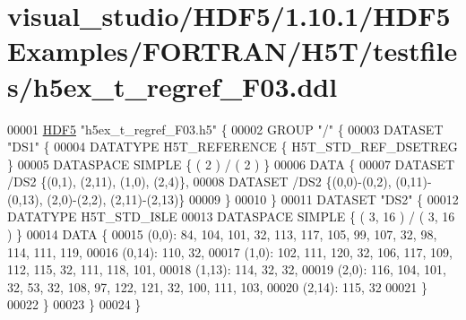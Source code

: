\hypertarget{visual__studio_2_h_d_f5_21_810_81_2_h_d_f5_examples_2_f_o_r_t_r_a_n_2_h5_t_2testfiles_2h5ex__t__regref___f03_8ddl_source}{}\section{visual\+\_\+studio/\+H\+D\+F5/1.10.1/\+H\+D\+F5\+Examples/\+F\+O\+R\+T\+R\+A\+N/\+H5\+T/testfiles/h5ex\+\_\+t\+\_\+regref\+\_\+\+F03.ddl}
\label{visual__studio_2_h_d_f5_21_810_81_2_h_d_f5_examples_2_f_o_r_t_r_a_n_2_h5_t_2testfiles_2h5ex__t__regref___f03_8ddl_source}

\begin{DoxyCode}
00001 \hyperlink{namespace_h_d_f5}{HDF5} \textcolor{stringliteral}{"h5ex\_t\_regref\_F03.h5"} \{
00002 GROUP \textcolor{stringliteral}{"/"} \{
00003    DATASET \textcolor{stringliteral}{"DS1"} \{
00004       DATATYPE  H5T\_REFERENCE \{ H5T\_STD\_REF\_DSETREG \}
00005       DATASPACE  SIMPLE \{ ( 2 ) / ( 2 ) \}
00006       DATA \{
00007          DATASET /DS2 \{(0,1), (2,11), (1,0), (2,4)\},
00008          DATASET /DS2 \{(0,0)-(0,2), (0,11)-(0,13), (2,0)-(2,2), (2,11)-(2,13)\}
00009       \}
00010    \}
00011    DATASET \textcolor{stringliteral}{"DS2"} \{
00012       DATATYPE  H5T\_STD\_I8LE
00013       DATASPACE  SIMPLE \{ ( 3, 16 ) / ( 3, 16 ) \}
00014       DATA \{
00015       (0,0): 84, 104, 101, 32, 113, 117, 105, 99, 107, 32, 98, 114, 111, 119,
00016       (0,14): 110, 32,
00017       (1,0): 102, 111, 120, 32, 106, 117, 109, 112, 115, 32, 111, 118, 101,
00018       (1,13): 114, 32, 32,
00019       (2,0): 116, 104, 101, 32, 53, 32, 108, 97, 122, 121, 32, 100, 111, 103,
00020       (2,14): 115, 32
00021       \}
00022    \}
00023 \}
00024 \}
\end{DoxyCode}
